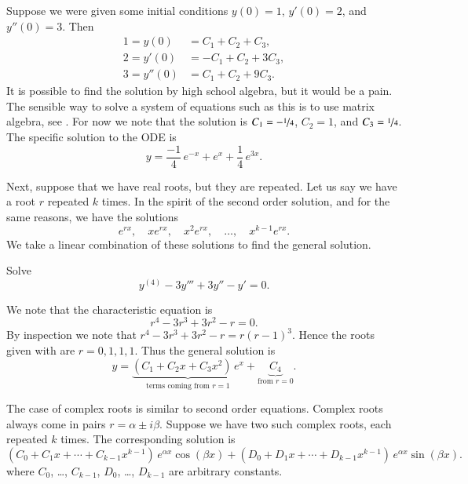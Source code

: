 \begin{example}
Suppose we were given some initial conditions $y(0) = 1$, $y'(0) = 2$,
and $y''(0) = 3$.  Then
\begin{align*}
1 = y(0) & = C_1 + C_2 + C_3 , \\
2 = y'(0) & = -C_1 + C_2 + 3C_3 , \\
3 = y''(0) & = C_1 + C_2 + 9C_3 .
\end{align*}
It is possible to find the solution by high school algebra, but it would be a
pain.
The sensible way to solve a system of equations such as this is to use
matrix algebra, see
.  For now we note that the solution is $C_1 =
-\nicefrac{1}{4}$,
$C_2 = 1$, and $C_3 = \nicefrac{1}{4}$.  The specific solution
to the ODE is
\begin{equation*}
y = \frac{-1}{4}\, e^{-x} + e^x + \frac{1}{4}\, e^{3x} .
\end{equation*}
\end{example}

Next, suppose that we have real roots, but they are repeated.  Let us say
we have
a root $r$ repeated $k$ times.  In the spirit of the second
order solution, and for the same reasons, we have the solutions
\begin{equation*}
e^{rx}, \quad xe^{rx}, \quad x^2 e^{rx}, \quad \ldots, \quad x^{k-1} e^{rx} .
\end{equation*}
We take a linear combination of these solutions to find the general
solution.

\begin{example}
Solve
\begin{equation*}
y^{(4)} - 3 y''' + 3 y'' - y' =  0 .
\end{equation*}

We note that the characteristic equation is
\begin{equation*}
r^4 - 3r^3 + 3r^2 -r = 0 .
\end{equation*}
By inspection we note that $r^4 - 3r^3 + 3r^2 -r = r{(r-1)}^3$.  Hence
the roots given with  are $r = 0, 1, 1, 1$.  Thus the general
solution is
\begin{equation*}
y = \underbrace{(C_1 + C_2 x + C_3 x^2)\, e^x}_{\text{terms coming from }
r=1} + \underbrace{C_4}_{\text{from } r=0} .
\end{equation*}
\end{example}

The case of complex roots is similar
to second order equations.
Complex roots
always come in pairs $r = \alpha \pm i \beta$.  Suppose we have
two such complex roots, each repeated $k$ times.
The corresponding solution is
\begin{equation*}
( C_0 + C_1 x + \cdots + C_{k-1} x^{k-1} ) \, e^{\alpha x} \cos (\beta x)
+
( D_0 + D_1 x + \cdots + D_{k-1} x^{k-1} ) \, e^{\alpha x} \sin (\beta x) .
\end{equation*}
where $C_0$, \ldots, $C_{k-1}$, $D_0$, \ldots, $D_{k-1}$ are arbitrary
constants.

